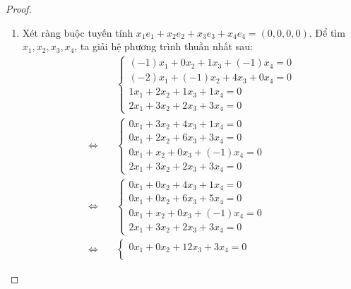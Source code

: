 \documentclass[class=linear-algebra,crop=false]{standalone}
\begin{document}
\begin{proof}
    \begin{enumerate}[label = (\alph*)]
        \item Xét ràng buộc tuyến tính $x_{1}e_{1} + x_{2}e_{2} + x_{3}e_{3} + x_{4}e_{4} = (0,0,0,0)$. Để tìm $x_{1}, x_{2}, x_{3}, x_{4}$, ta giải hệ phương trình thuần nhất sau:
              \begin{align*}
                                       & \begin{cases}
                                             (-1)x_{1} + 0x_{2} + 1x_{3} + (-1)x_{4} = 0 \\
                                             (-2)x_{1} + (-1)x_{2} + 4x_{3} + 0x_{4} = 0 \\
                                             1x_{1} + 2x_{2} + 1x_{3} + 1x_{4} = 0       \\
                                             2x_{1} + 3x_{2} + 2x_{3} + 3x_{4} = 0
                                         \end{cases} \\
                  \Leftrightarrow\quad &
                  \begin{cases}
                      0x_{1} + 3x_{2} + 4x_{3} + 1x_{4} = 0   \\
                      0x_{1} + 2x_{2} + 6x_{3} + 3x_{4} = 0   \\
                      0x_{1} + x_{2} + 0x_{3} + (-1)x_{4} = 0 \\
                      2x_{1} + 3x_{2} + 2x_{3} + 3x_{4} = 0
                  \end{cases}                            \\
                  \Leftrightarrow\quad &
                  \begin{cases}
                      0x_{1} + 0x_{2} + 4x_{3} + 1x_{4} = 0   \\
                      0x_{1} + 0x_{2} + 6x_{3} + 5x_{4} = 0   \\
                      0x_{1} + x_{2} + 0x_{3} + (-1)x_{4} = 0 \\
                      2x_{1} + 3x_{2} + 2x_{3} + 3x_{4} = 0
                  \end{cases}                            \\
                  \Leftrightarrow\quad &
                  \begin{cases}
                      0x_{1} + 0x_{2} + 12x_{3} + 3x_{4} = 0  \\

\end{cases}
\end{align*}
\end{enumerate}
\end{proof}
\end{document}
